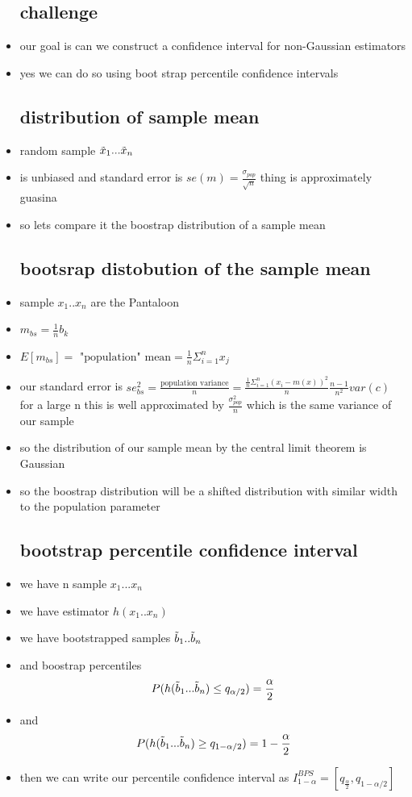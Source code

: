 \documentclass{article}
\begin{document}
\begin{itemize}
\subsection{challenge}
\item our goal is can we construct a confidence interval for non-Gaussian estimators

\item yes we can do so using boot strap percentile confidence intervals
\subsection{distribution of sample mean}
\item random sample $\Tilde{x}_1...\Tilde{x}_n$
\item is unbiased and standard error is $se(m)=\frac{\sigma_{pop}}{\sqrt{n}}$ thing is approximately guasina  
\item so lets compare it the boostrap distribution of a sample mean 
\subsection{bootsrap distobution of the sample mean}
\item sample $x_1..x_n$ are the Pantaloon 
\item $m_{bs}=\frac{1}{n}b_k$
\item $E[m_{bs}]=\text{ "population" mean}= \frac{1}{n}\Sigma_{i=1}^{n}x_j$
\item our standard error is $se^2_{bs}=\frac{\text{population variance}}{n}=\frac{\frac{1}{n}\Sigma_{i=1}^{n}(x_i-m(x))^2}{n}\frac{n-1}{n^2}var(c)$ for a large n this is well approximated by  $\frac{\sigma_{pop}^2}{n}$ which is the same variance of our sample
\item so the distribution of our sample mean by the central limit theorem is Gaussian 
\item so the boostrap distribution will be a shifted distribution with similar width to the population parameter
\subsection{bootstrap percentile confidence interval}
\item we have n sample $x_1...x_n$
\item we have estimator $h(x_1..x_n)$
\item we have bootstrapped samples $\Tilde{b}_1..\Tilde{b}_n$
\item and boostrap percentiles $$P(h(\Tilde{b}_1...\Tilde{b}_n)\leq q_{\alpha/2})=\frac{\alpha}{2}$$
\item and $$P(h(\Tilde{b}_1...\Tilde{b}_n)\geq q_{1-\alpha/2})=1-\frac{\alpha}{2}$$
\item then we can write our percentile confidence interval as $I_{1-\alpha}^{BPS}=[q_{\frac{\alpha}{2}},q_{1-\alpha/2}]$

\end{itemize}
\end{document}
